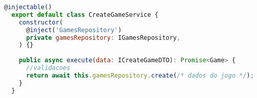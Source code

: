 \begin{lstlisting}[language=JavaScript, caption={O Caso de Uso},captionpos=b, label=alg:usecase]
  @injectable()
  export default class CreateGameService {
    constructor(
      @inject('GamesRepository')
      private gamesRepository: IGamesRepository,
    ) {}
  
    public async execute(data: ICreateGameDTO): Promise<Game> {
      //validacoes
      return await this.gamesRepository.create(/* dados do jogo */);
    }
  }
\end{lstlisting}
